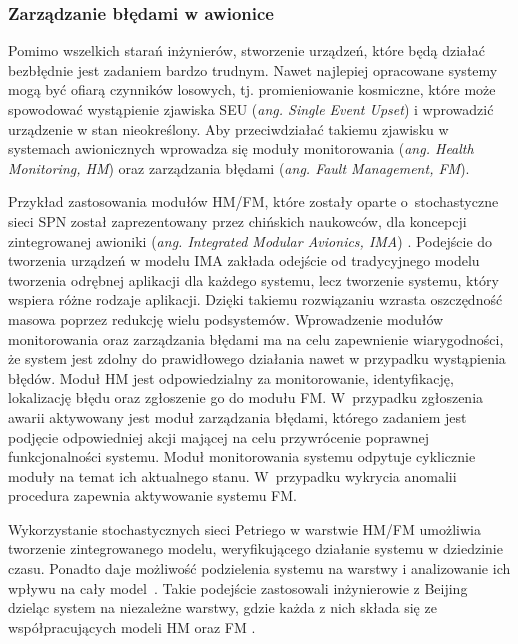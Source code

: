 \documentclass[a4paper, 12pt, twoside]{article}
\begin{document}
\subsubsection{Zarządzanie błędami w awionice} \label{hmfm}
Pomimo wszelkich starań inżynierów, stworzenie urządzeń, które będą działać bezbłędnie jest zadaniem bardzo trudnym. Nawet najlepiej opracowane systemy mogą być ofiarą czynników losowych, tj. promieniowanie kosmiczne, które może spowodować wystąpienie zjawiska SEU (\textit{ang. Single Event Upset}) i wprowadzić urządzenie w stan nieokreślony. Aby przeciwdziałać takiemu zjawisku w systemach awionicznych wprowadza się moduły monitorowania (\textit{ang. Health Monitoring, HM}) oraz zarządzania błędami (\textit{ang. Fault Management, FM}).

Przykład zastosowania modułów HM/FM, które zostały oparte o~stochastyczne sieci SPN został zaprezentowany przez chińskich naukowców, dla koncepcji zintegrowanej awioniki (\textit{ang. Integrated Modular Avionics, IMA}) \cite{stochasticHMFMPetri}. Podejście do tworzenia urządzeń w modelu IMA zakłada odejście od tradycyjnego modelu tworzenia odrębnej aplikacji dla każdego systemu, lecz tworzenie systemu, który wspiera różne rodzaje aplikacji. Dzięki takiemu rozwiązaniu wzrasta oszczędność masowa poprzez redukcję wielu podsystemów. Wprowadzenie modułów monitorowania oraz zarządzania błędami ma na celu zapewnienie wiarygodności, że system jest zdolny do prawidłowego działania nawet w przypadku wystąpienia błędów. Moduł HM jest odpowiedzialny za monitorowanie, identyfikację, lokalizację błędu oraz zgłoszenie go do modułu FM. W~przypadku zgłoszenia awarii aktywowany jest moduł zarządzania błędami, którego zadaniem jest podjęcie odpowiedniej akcji mającej na celu przywrócenie poprawnej funkcjonalności systemu. Moduł monitorowania systemu odpytuje cyklicznie moduły na temat ich aktualnego stanu. W~przypadku wykrycia anomalii procedura zapewnia aktywowanie systemu FM.

Wykorzystanie stochastycznych sieci Petriego w warstwie HM/FM umożliwia tworzenie zintegrowanego modelu, weryfikującego działanie systemu w dziedzinie czasu. Ponadto daje możliwość podzielenia systemu na warstwy i analizowanie ich wpływu na cały model~\cite{stochasticHMFMPetri}. Takie podejście zastosowali inżynierowie z Beijing dzieląc system na niezależne warstwy, gdzie każda z nich składa się ze współpracujących modeli HM oraz FM \cite{stochasticHMFMPetri}. 
\end{document}
